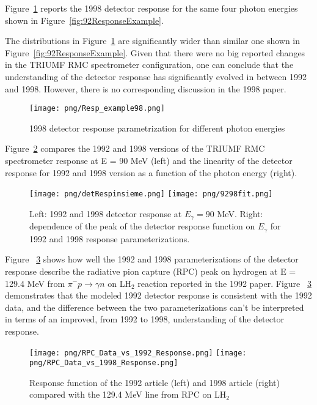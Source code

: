 Figure~\ref{fig:response98} reports the 1998 detector response for the same four photon energies shown in Figure~\ref{fig:92ResponseExample}.

The distributions in Figure~\ref{fig:response98} are significantly wider than similar one
shown in Figure~\ref{fig:92ResponseExample}. Given that there were no big reported changes in the TRIUMF
RMC spectrometer configuration, one can conclude that the understanding of the detector response has
significantly evolved in between 1992 and 1998. However, there is no corresponding discussion 
in the 1998 paper. 

\begin{figure}[!h]
\centering
\texttt{[image: png/Resp\_example98.png]}
\caption{1998 detector response parametrization for different photon energies}
\label{fig:response98}
\end{figure}

Figure~\ref{fig:shapecomp} compares the 1992 and 1998 versions of the
TRIUMF RMC spectrometer response at E = 90 MeV (left) and 
the linearity of the detector response for 1992 and 1998 version
as a function of the photon energy (right).

\begin{figure} [!h]
\centering
\texttt{[image: png/detRespinsieme.png]}
\texttt{[image: png/9298fit.png]}
\caption{
  Left: 1992 and 1998 detector response at $E_{\gamma}=90$ MeV.
  Right: dependence of the peak of the detector response function on $E_{\gamma}$
  for 1992 and 1998 response parameterizations.
}
\label{fig:shapecomp} 
\end{figure}

Figure ~\ref{p004} shows how well the 1992 and 1998 parameterizations of the detector
response describe the radiative pion capture (RPC) peak on hydrogen at E = 129.4 MeV
from $\pi^{-}p \rightarrow \gamma n$ on LH$_{2}$ reaction reported in the 1992 paper.
Figure ~\ref{p004} demonstrates that the modeled 1992 detector response is consistent
with the 1992 data, and the difference between the two parameterizations can't be
interpreted in terms of an improved, from 1992 to 1998, understanding of the detector
response.\\

  \begin{figure}[!h]
 \begin{center}
 \texttt{[image: png/RPC\_Data\_vs\_1992\_Response.png]} 
 \texttt{[image: png/RPC\_Data\_vs\_1998\_Response.png]} 
 \end{center}
 \caption{Response function of the 1992 article (left) and 1998 article (right) compared with the 129.4 MeV line from RPC on LH$_{2}$}
 \label{p004}
 \end{figure}

